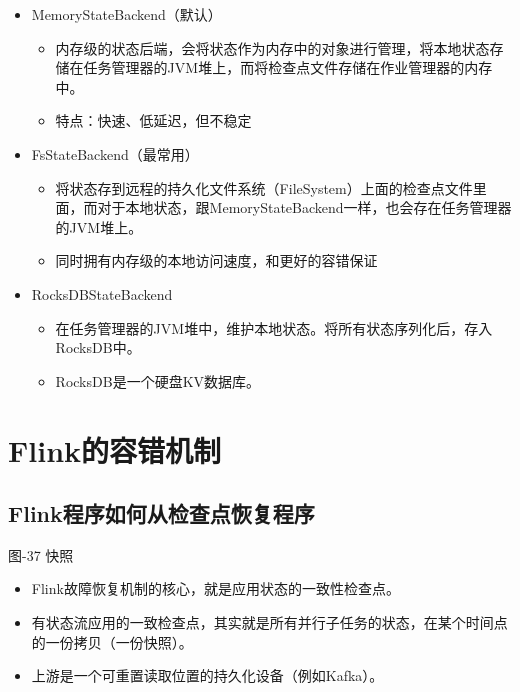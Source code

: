 \begin{itemize}
\tightlist
\item
  MemoryStateBackend（默认）

  \begin{itemize}
  \tightlist
  \item
    内存级的状态后端，会将状态作为内存中的对象进行管理，将本地状态存储在任务管理器的JVM堆上，而将检查点文件存储在作业管理器的内存中。
  \item
    特点：快速、低延迟，但不稳定
  \end{itemize}
\item
  FsStateBackend（最常用）

  \begin{itemize}
  \tightlist
  \item
    将状态存到远程的持久化文件系统（FileSystem）上面的检查点文件里面，而对于本地状态，跟MemoryStateBackend一样，也会存在任务管理器的JVM堆上。
  \item
    同时拥有内存级的本地访问速度，和更好的容错保证
  \end{itemize}
\item
  RocksDBStateBackend

  \begin{itemize}
  \tightlist
  \item
    在任务管理器的JVM堆中，维护本地状态。将所有状态序列化后，存入RocksDB中。
  \item
    RocksDB是一个硬盘KV数据库。
  \end{itemize}
\end{itemize}

\hypertarget{flinkux7684ux5bb9ux9519ux673aux5236}{%
\section{Flink的容错机制}\label{flinkux7684ux5bb9ux9519ux673aux5236}}

\hypertarget{flinkux7a0bux5e8fux5982ux4f55ux4eceux68c0ux67e5ux70b9ux6062ux590dux7a0bux5e8f}{%
\subsection{Flink程序如何从检查点恢复程序}\label{flinkux7a0bux5e8fux5982ux4f55ux4eceux68c0ux67e5ux70b9ux6062ux590dux7a0bux5e8f}}

图-37 快照

\begin{itemize}
\tightlist
\item
  Flink故障恢复机制的核心，就是应用状态的一致性检查点。
\item
  有状态流应用的一致检查点，其实就是所有并行子任务的状态，在某个时间点的一份拷贝（一份快照）。
\item
  上游是一个可重置读取位置的持久化设备（例如Kafka）。
\end{itemize}

